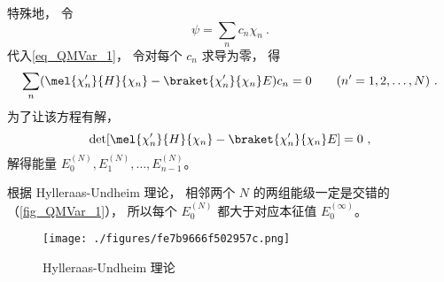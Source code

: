 特殊地， 令
\begin{equation}
\psi = \sum_n c_n \chi_n~.
\end{equation}
代入\autoref{eq_QMVar_1}， 令对每个 $c_n$ 求导为零， 得
\begin{equation}
\sum_n (\mel{\chi_n'}{H}{\chi_n} - \braket{\chi_n'}{\chi_n}E)c_n = 0 \qquad (n' = 1,2,\dots,N)~.
\end{equation}
为了让该方程有解，
\begin{equation}
\det[\mel{\chi_n'}{H}{\chi_n} - \braket{\chi_n'}{\chi_n}E] = 0~,
\end{equation}
解得能量 $E_0^{(N)}, E_1^{(N)},\dots,E_{n-1}^{(N)}$。

根据 Hylleraas-Undheim 理论， 相邻两个 $N$ 的两组能级一定是交错的（\autoref{fig_QMVar_1}）， 所以每个 $E_0^{(N)}$ 都大于对应本征值 $E_0^{(\infty)}$。
\begin{figure}[ht]
\centering
\texttt{[image: ./figures/fe7b9666f502957c.png]}
\caption{Hylleraas-Undheim 理论} \label{fig_QMVar_1}
\end{figure}
